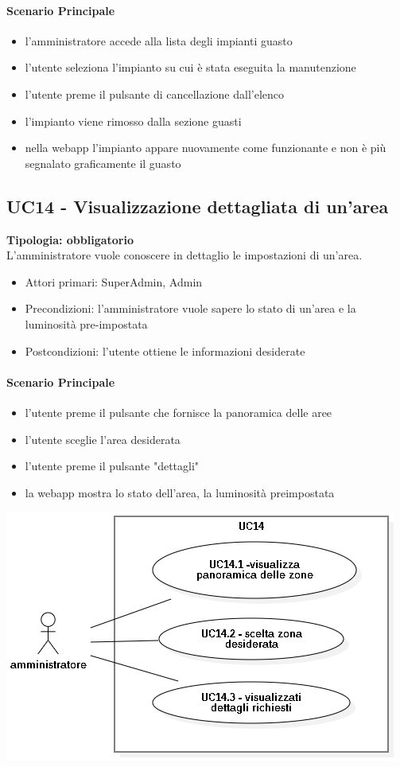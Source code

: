 \documentclass[12pt]{article}
\begin{document}
\paragraph{Scenario Principale}
\begin{itemize}
	\item l'amministratore accede alla lista degli impianti guasto
	\item l'utente seleziona l'impianto su cui è stata eseguita la manutenzione
	\item l'utente preme il pulsante di cancellazione dall'elenco
	\item l'impianto viene rimosso dalla sezione guasti
	\item nella webapp l'impianto appare nuovamente come funzionante e non è più segnalato graficamente il guasto
\end{itemize}


\subsection{UC14 - Visualizzazione dettagliata di un'area}
\textbf{Tipologia: obbligatorio} \\
L'amministratore vuole conoscere in dettaglio le impostazioni di un'area.
\begin{itemize}
	\item Attori primari: SuperAdmin, Admin
	\item Precondizioni: l'amministratore vuole sapere lo stato di un'area e la luminosità pre-impostata
	\item Postcondizioni: l'utente ottiene le informazioni desiderate
\end{itemize}
\paragraph{Scenario Principale}
\begin{itemize}
	\item l'utente preme il pulsante che fornisce la panoramica delle aree
	\item l'utente sceglie l'area desiderata
	\item l'utente preme il pulsante "dettagli"
	\item la webapp mostra lo stato dell'area, la luminosità preimpostata
\end{itemize}

\includegraphics[scale=0.5]{UC14.png}
\end{document}
